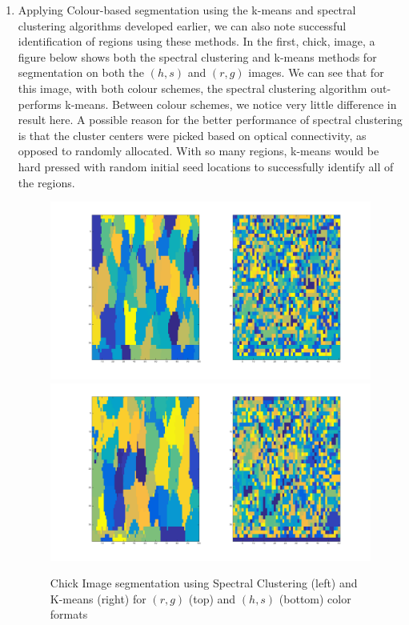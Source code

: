\documentclass[10pt]{article}
\begin{document}
\begin{enumerate}
\begin{enumerate}
\item Applying Colour-based segmentation using the k-means and spectral clustering algorithms developed earlier, we can also note successful identification of regions using these methods. In the first, chick, image, a figure below shows both the spectral clustering and k-means methods for segmentation on both the $(h,s)$ and $(r,g)$ images. We can see that for this image, with both colour schemes, the spectral clustering algorithm out-performs k-means. Between colour schemes, we notice very little difference in result here. A possible reason for the better performance of spectral clustering is that the cluster centers were picked based on optical connectivity, as opposed to randomly allocated. With so many regions, k-means would be hard pressed with random initial seed locations to successfully identify all of the regions.
\begin{figure}[h!] \includegraphics[scale=0.35]{hw6q1c1.png} \includegraphics[scale=0.35]{hw6q1c2.png} \caption[h3]{Chick Image segmentation using Spectral Clustering (left) and K-means (right) for $(r,g)$ (top) and $(h,s)$ (bottom) color formats} \end{figure} \\


\end{enumerate}
\end{enumerate}
\end{document}
